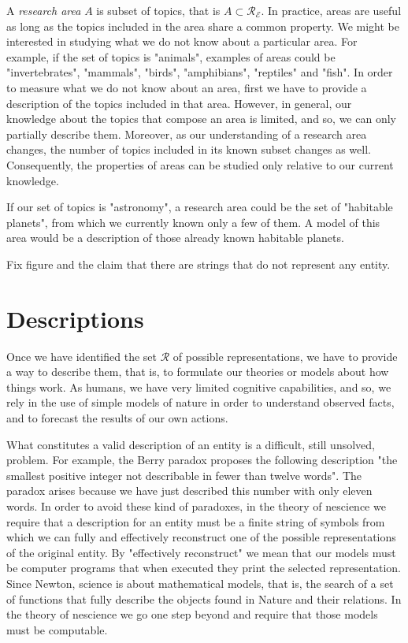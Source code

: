 A \emph{research area} $A$ is subset of topics, that is $A \subset \mathcal{R}_\mathcal{E}$. In practice, areas are useful as long as the topics included in the area share a common property. We might be interested in studying what we do not know about a particular area. For example, if the set of topics is "animals", examples of areas could be "invertebrates", "mammals", "birds", "amphibians", "reptiles" and "fish". In order to measure what we do not know about an area, first we have to provide a description of the topics included in that area. However, in general, our knowledge about the topics that compose an area is limited, and so, we can only partially describe them. Moreover, as our understanding of a research area changes, the number of topics included in its known subset changes as well. Consequently, the properties of areas can be studied only relative to our current knowledge.

\begin{example}
If our set of topics is "astronomy", a research area could be the set of "habitable planets", from which we currently known only a few of them. A model of this area would be a description of those already known habitable planets.
\end{example}

{\color{red} Fix figure and the claim that there are strings that do not represent any entity.}

%
%

\section{Descriptions}

Once we have identified the set $\mathcal{R}$ of possible representations, we have to provide a way to describe them, that is, to formulate our theories or models about how things work. As humans, we have very limited cognitive capabilities, and so, we rely in the use of simple models of nature in order to understand observed facts, and to forecast the results of our own actions. 

What constitutes a valid description of an entity is a difficult, still unsolved, problem. For example, the Berry paradox proposes the following description "the smallest positive integer not describable in fewer than twelve words". The paradox arises because we have just described this number with only eleven words. In order to avoid these kind of paradoxes, in the theory of nescience we require that a description for an entity must be a finite string of symbols from which we can fully and effectively reconstruct one of the possible representations of the original entity. By "effectively reconstruct" we mean that our models must be computer programs that when executed they print the selected representation. Since Newton, science is about mathematical models, that is, the search of a set of functions that fully describe the objects found in Nature and their relations. In the theory of nescience we go one step beyond and require that those models must be computable.

